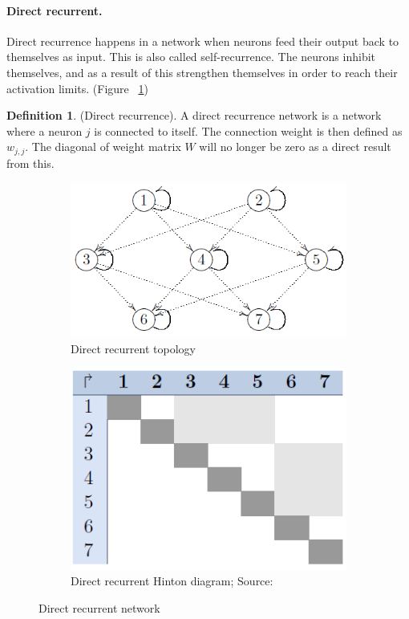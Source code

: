 \documentclass[pdftex,a4paper,12pt,twoside]{report}
\theoremstyle{plain} \newtheorem{theorem}{Theorem} \newtheorem{proposition}{Proposition} \newtheorem{lemma}{Lemma} \newtheorem*{corollary}{Corollary}
\theoremstyle{definition} \newtheorem{definition}{Definition} \newtheorem{conjecture}{Conjecture} \newtheorem*{example}{Example} \newtheorem{algorithm}{Algorithm}
\theoremstyle{remark} \newtheorem*{remark}{Remark} \newtheorem*{note}{Note} \newtheorem{case}{Case}
\begin{document}
\paragraph{Direct recurrent.}
Direct recurrence happens in a network when neurons feed their output back to themselves as input. This is also called self-recurrence. The neurons inhibit themselves, and as a result of this strengthen themselves in order to reach their activation limits. (Figure ~\ref{fig:directrecurrent})
\begin{definition}
(Direct recurrence). A direct recurrence network is a network where a neuron $j$ is connected to itself. The connection weight is then defined as $w_{j,j}$. The diagonal of weight matrix $W$ will no longer be zero as a direct result from this.
\end{definition}
\begin{figure}
\centering
	\begin{subfigure}[b]{0.49\textwidth}
	\centering
	\includegraphics[width=\textwidth]{./img/recurrent-direct-Topology.png}
	\caption{Direct recurrent topology}
	\end{subfigure}
	\begin{subfigure}[b]{0.49\textwidth}
	\centering
	\includegraphics[width=\textwidth]{./img/recurrent-direct-Hinton.png}
	\caption{Direct recurrent Hinton diagram; Source:\citep{Kriesel2013}}
	\end{subfigure}
\caption{Direct recurrent network}
\label{fig:directrecurrent}
\end{figure}
\end{document}
